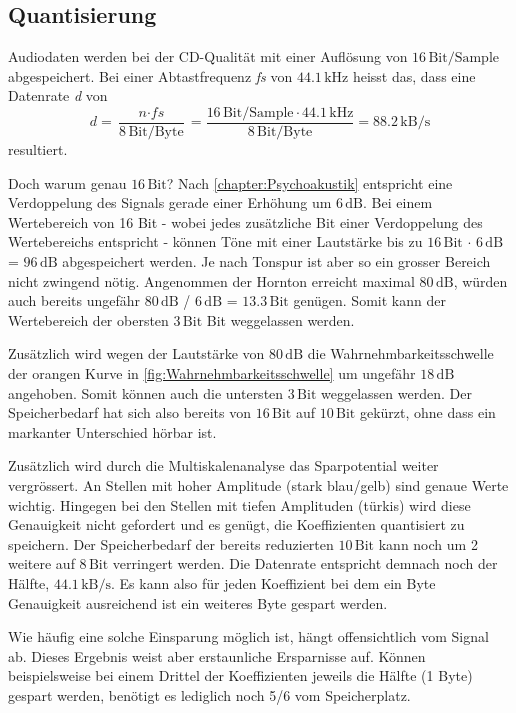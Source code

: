 \begin{refsection}
\subsection{Quantisierung}
Audiodaten werden bei der CD-Qualität mit einer Auflösung von $16\,\text{Bit/Sample}$ abgespeichert. 
Bei einer Abtastfrequenz \textit{fs} von $44.1\,\text{kHz}$ heisst das, dass eine Datenrate \textit{d} von 
\begin{equation}
\textit{d} = \frac{\textit{n} \cdot \textit{fs}}{8\,\text{Bit/Byte}} = \frac{16\,\text{Bit/Sample} \cdot 44.1\,\text{kHz}}{8\,\text{Bit/Byte}} = 88.2\,\text{kB/s}
\end{equation}
resultiert.

Doch warum genau $16\,\text{Bit}$?
Nach \autoref{chapter:Psychoakustik} entspricht eine Verdoppelung des Signals gerade einer Erhöhung um $6\,\text{dB}$.
Bei einem Wertebereich von 16 Bit - wobei jedes zusätzliche Bit einer Verdoppelung des Wertebereichs entspricht - können Töne mit einer Lautstärke bis zu
$16\,\text{Bit}$ $\cdot$ $6\,\text{dB}$ = $96\,\text{dB}$
abgespeichert werden.
Je nach Tonspur ist aber so ein grosser Bereich nicht zwingend nötig.
Angenommen der Hornton erreicht maximal $80\,\text{dB}$, würden auch bereits ungefähr
$80\,\text{dB}$ / $6\,\text{dB}$ =  $13.3\,\text{Bit}$
genügen. 
Somit kann der Wertebereich der obersten $3\,\text{Bit}$ Bit weggelassen werden.

Zusätzlich wird wegen der Lautstärke von $80\,\text{dB}$ die Wahrnehmbarkeitsschwelle der orangen Kurve in \autoref{fig:Wahrnehmbarkeitsschwelle} um ungefähr $18\,\text{dB}$ angehoben.
Somit können auch die untersten $3\,\text{Bit}$ weggelassen werden.
Der Speicherbedarf hat sich also bereits von $16\,\text{Bit}$ auf $10\,\text{Bit}$ gekürzt, ohne dass ein markanter Unterschied hörbar ist.

Zusätzlich wird durch die Multiskalenanalyse das Sparpotential weiter vergrössert.
An Stellen mit hoher Amplitude (stark blau/gelb) sind genaue Werte wichtig.
Hingegen bei den Stellen mit tiefen Amplituden (türkis) wird diese Genauigkeit nicht gefordert und es genügt, die Koeffizienten quantisiert zu speichern.
Der Speicherbedarf der bereits reduzierten $10\,\text{Bit}$ kann noch um 2 weitere auf $8\,\text{Bit}$ verringert werden.
Die Datenrate entspricht demnach noch der Hälfte, $44.1\,\text{kB/s}$.
Es kann also für jeden Koeffizient bei dem ein Byte Genauigkeit ausreichend ist ein weiteres Byte gespart werden.

Wie häufig eine solche Einsparung möglich ist, hängt offensichtlich vom Signal ab.
Dieses Ergebnis weist aber erstaunliche Ersparnisse auf.
Können beispielsweise bei einem Drittel der Koeffizienten jeweils die Hälfte (1 Byte) gespart werden, benötigt es lediglich noch 5/6 vom Speicherplatz.


\end{refsection}
